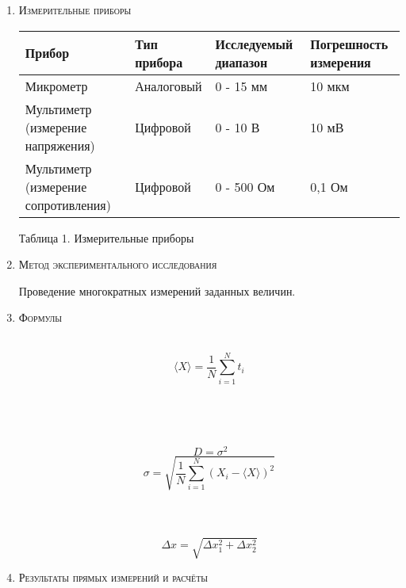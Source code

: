 \documentclass[12pt]{article}
\begin{document}
\begin{enumerate}
    \item \large\textsc{Измерительные приборы}
    \\


     \begin{center}
         
   
      \begin{tabular}{|m{7em}|m{7em}|m{7em}|m{7em}|}
    
       \hline
       Прибор & Тип прибора & Исследуемый диапазон & Погрешность измерения        \\ \hline
       Микрометр & 
       Аналоговый & 0 - 15 мм & 10 мкм\\ \hline
       Мультиметр (измерение напряжения)   & Цифровой & 0 - 10 В & 10 мВ \\ \hline
       Мультиметр (измерение сопротивления)   & Цифровой & 0 - 500 Ом & 0,1 Ом \\ \hline              
      \end{tabular}
     \end{center}   
      \begin{center}
        Таблица 1. Измерительные приборы \\
      \end{center}
    \item \large\textsc{Метод экспериментального исследования}

    Проведение многократных измерений заданных величин.
    

    \item \large\textsc{Формулы}

\\
\begin{equation}
    \langle X \rangle = \frac{1}{N} \sum_{i=1}^{N} t_i
\end{equation}
\\

\\
\\
\\
\begin{equation}
    \ D=\sigma^2 
\end{equation}
\begin{equation}
        \sigma = \sqrt{\frac{1}{N} \sum_{i=1}^{N} (X_i-\langle X \rangle)^2}
\end{equation}
\\
\\
 \\
\begin{equation}
	\Delta x = \sqrt{\Delta x_1^2 + \Delta x_2^2}
\end{equation}
    \item \large\textsc{Результаты прямых  измерений и расчёты}
    

\end{enumerate}
\end{document}

